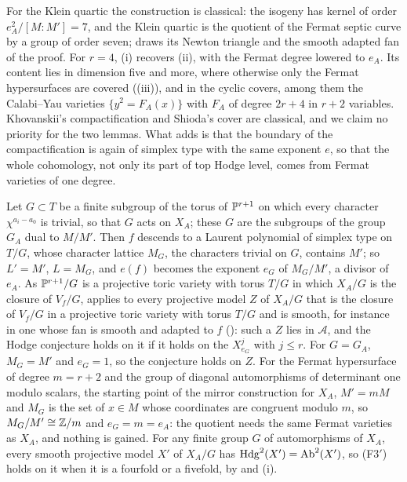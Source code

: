 For the Klein quartic the construction is classical: the isogeny has kernel
of order $e_{A}^{2}/[M:M']=7$, and the Klein quartic is the quotient of the
Fermat septic curve by a group of order seven;  draws
its Newton triangle and the smooth adapted fan of the proof. For $r=4$,
(i) recovers (ii), with the Fermat
degree lowered to $e_{A}$. Its content lies in dimension five and more, where
otherwise only the Fermat hypersurfaces are covered
((iii)), and in the cyclic covers, among them the Calabi--Yau
varieties $\{y^{2}=F_{A}(x)\}$ with $F_{A}$ of degree $2r+4$ in $r+2$
variables. Khovanskii's compactification and Shioda's cover are classical, and
we claim no priority for the two lemmas. What  adds is
that the boundary of the compactification is again of simplex type with the
same exponent $e$, so that the whole cohomology, not only its part of top
Hodge level, comes from Fermat varieties of one degree.

\begin{remark}\label{rem:delsartequotient}
Let $G\subset T$ be a finite subgroup of the torus of $\mathbb{P}^{r+1}$ on which
every character $\chi^{a_{i}-a_{0}}$ is trivial, so that $G$ acts on $X_{A}$;
these $G$ are the subgroups of the group $G_{A}$ dual to $M/M'$. Then $f$
descends to a Laurent polynomial of simplex type on $T/G$, whose character
lattice $M_{G}$, the characters trivial on $G$, contains $M'$; so $L'=M'$,
$L=M_{G}$, and $e(f)$ becomes the exponent $e_{G}$ of $M_{G}/M'$, a divisor of
$e_{A}$. As $\mathbb{P}^{r+1}/G$ is a projective toric variety with torus $T/G$ in
which $X_{A}/G$ is the closure of $V_{f}/G$,  applies
to every projective model $Z$ of $X_{A}/G$ that is the closure of $V_{f}/G$
in a projective toric variety with torus $T/G$ and is smooth, for instance in
one whose fan is smooth and adapted to $f$ (): such a
$Z$ lies in $\mathcal{A}$, and the Hodge conjecture holds on it if it holds
on the $X^{j}_{e_{G}}$ with $j\le r$. For $G=G_{A}$, $M_{G}=M'$ and $e_{G}=1$,
so the conjecture holds on $Z$. For the Fermat hypersurface of degree
$m=r+2$ and the group of diagonal automorphisms of determinant one modulo
scalars, the starting point of the mirror construction for $X_{A}$, $M'=mM$
and $M_{G}$ is the set of $x\in M$ whose coordinates are congruent modulo
$m$, so $M_{G}/M'\cong\mathbb{Z}/m$ and $e_{G}=m=e_{A}$: the quotient needs the
same Fermat varieties as $X_{A}$, and nothing is gained. For any finite
group $G$ of automorphisms of $X_{A}$, every smooth projective model $X'$ of
$X_{A}/G$ has $\mathrm{Hdg}^{2}(X')=\mathrm{Ab}^{2}(X')$, so \textup{(F3$'$)} holds on
it when it is a fourfold or a fivefold, by  and
(i).
\end{remark}

